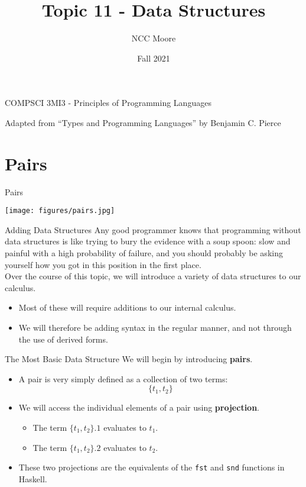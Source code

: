 \documentclass[11pt]{beamer}
\author{NCC Moore}
\title{Topic 11 - Data Structures}
\institute{McMaster University}
\date{Fall 2021}
\begin{document}
\begin{frame}
\center
COMPSCI 3MI3 - Principles of Programming Languages
\titlepage

Adapted from ``Types and Programming Languages'' by Benjamin C. Pierce 
\end{frame}

\begin{frame}
\tableofcontents
\end{frame}


\section[Pairs]{Pairs}
\begin{frame}[fragile=singleslide]{Pairs}
\begin{center}
\texttt{[image: figures/pairs.jpg]}
\end{center}
\end{frame}


\begin{frame}[fragile=singleslide]{Adding Data Structures}
Any good programmer knows that programming without data structures is like trying to bury the evidence with a soup spoon: slow and painful with a high probability of failure, and you should probably be asking yourself how you got in this position in the first place. \\  
\vspace{1em}
Over the course of this topic, we will introduce a variety of data structures to our calculus.
\begin{itemize}
\item Most of these will require additions to our internal calculus.  
\item We will therefore be adding syntax in the regular manner, and not through the use of derived forms.
\end{itemize}
\end{frame}


\begin{frame}[fragile=singleslide]{The Most Basic Data Structure}
We will begin by introducing \textbf{pairs}.
\begin{itemize}
\item A pair is very simply defined as a collection of two terms:
\begin{equation}
\{t_1, t_2\}
\end{equation}
\item We will access the individual elements of a pair using \textbf{projection}. 
\begin{itemize}
\item The term $\{t_1,t_2\}.1$ evaluates to $t_1$.
\item The term $\{t_1,t_2\}.2$ evaluates to $t_2$.  
\end{itemize}
\item These two projections are the equivalents of the \texttt{fst} and \texttt{snd} functions in Haskell.  
\end{itemize}
\end{frame}
\end{document}
